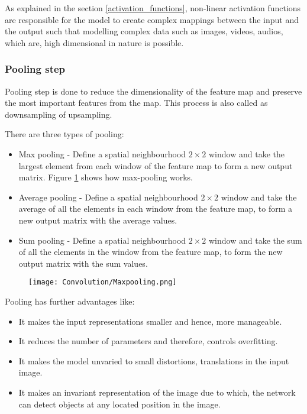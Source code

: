 As explained in the section \ref{activation_functions}, non-linear activation functions are responsible for the model to create complex mappings between the input and the output such that modelling complex data such as images, videos, audios, which are, high dimensional in nature is possible.

\subsubsection{Pooling step}

Pooling step is done to reduce the dimensionality of the feature map and preserve the most important features from the map. This process is also called as downsampling of upsampling.

There are three types of pooling: 

\begin{itemize}
    \item Max pooling - Define a spatial neighbourhood $2\times2$ window and take the largest element from each window of the feature map to form a new output matrix. Figure \ref{maxpool} shows how max-pooling works. 
    
    \item Average pooling - Define a spatial neighbourhood $2\times2$ window and take the average of all the elements in each window from the feature map, to form a new output matrix with the average values.
    
    \item Sum pooling - Define a spatial neighbourhood $2\times2$ window and take the sum of all the elements in the window from the feature map, to form the new output matrix with the sum values.
\end{itemize}

\begin{figure}[h!]
    \centering
        \texttt{[image: Convolution/Maxpooling.png]}
    \caption{\cite{VoPa}}
    \label{maxpool}
\end{figure}

Pooling has further advantages like:

\begin{itemize}
    \item It makes the input representations smaller and hence, more manageable.
    \item It reduces the number of parameters and therefore, controls overfitting.
    \item It makes the model unvaried to small distortions, translations in the input image.
    \item It makes an invariant representation of the image due to which, the network can detect objects at any located position in the image. 
\end{itemize}

